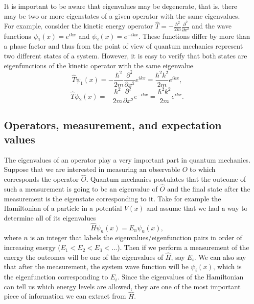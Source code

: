 \documentclass[../Main/chem331-notes.tex]{subfiles}
\begin{document}
It is important to be aware that eigenvalues may be degenerate, that is, there may be two or more eigenstates of a given operator with the same eigenvalues.
For example, consider the kinetic energy operator $\hat{T} = - \frac{\hbar^2}{2m} \frac{\partial^2}{\partial x^2}$ and the wave functions $\psi_1(x) = e^{ikx}$ and $\psi_2(x) = e^{-ikx}$.
These functions differ by more than a phase factor and thus from the point of view of quantum mechanics represent two different states of a system.
However, it is easy to verify that both states are eigenfunctions of the kinetic operator with the same eigenvalue
\begin{equation}
\hat{T} \psi_1(x) = - \frac{\hbar^2}{2m} \frac{\partial^2}{\partial x^2} e^{ikx}
 = \frac{\hbar^2 k^2}{2m} e^{ikx},
\end{equation}
 \begin{equation}
\hat{T} \psi_2(x) = - \frac{\hbar^2}{2m} \frac{\partial^2}{\partial x^2} e^{-ikx}
 = \frac{\hbar^2 k^2}{2m} e^{ikx}.
\end{equation}


\subsection{Operators, measurement, and expectation values}
The eigenvalues of an operator play a very important part in quantum mechanics.
Suppose that we are interested in measuring an observable $O$ to which corresponds the operator $\hat{O}$.
Quantum mechanics postulates that the outcome of such a measurement is going to be an eigenvalue of $\hat{O}$ and the final state after the measurement is the eigenstate corresponding to it.
Take for example the Hamiltonian of a particle in a potential $V(x)$ and assume that we had a way to determine all of its eigenvalues
\begin{equation}
\hat{H} \psi_n(x) = E_n \psi_n(x),
\end{equation}
where $n$ is an integer that labels the eigenvalues/eigenfunction pairs in order of increasing energy ($E_1 < E_2 < E_3 < \ldots$).
Then if we perform a measurement of the energy the outcomes will be one of the eigenvalues of $\hat{H}$, say $E_i$.
We can also say that after the measurement, the system wave function will be $\psi_i(x)$, which is the eigenfunction corresponding to $E_i$.
Since the eigenvalues of the Hamiltonian can tell us which energy levels are allowed, they are one of the most important piece of information we can extract from $\hat{H}$.
\end{document}
